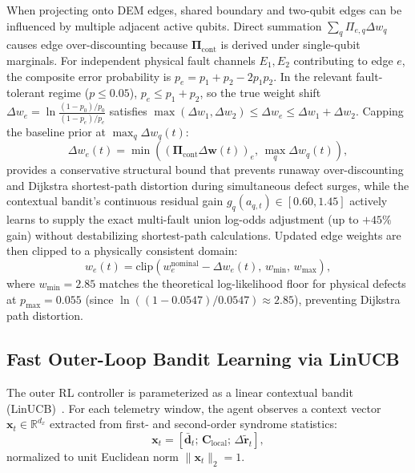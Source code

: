 \documentclass[aps,prxquantum,reprint,superscriptaddress,floatfix,nofootinbib]{revtex4-2}
\begin{document}
When projecting onto DEM edges, shared boundary and two-qubit edges can be influenced by multiple adjacent active qubits. Direct summation $\sum_q \Pi_{e, q} \Delta w_q$ causes edge over-discounting because $\mathbf{\Pi}_{\text{cont}}$ is derived under single-qubit marginals. For independent physical fault channels $E_1, E_2$ contributing to edge $e$, the composite error probability is $p_e = p_1 + p_2 - 2p_1 p_2$. In the relevant fault-tolerant regime ($p \le 0.05$), $p_e \le p_1 + p_2$, so the true weight shift $\Delta w_e = \ln \frac{(1-p_0)/p_0}{(1-p_e)/p_e}$ satisfies $\max(\Delta w_1, \Delta w_2) \le \Delta w_e \le \Delta w_1 + \Delta w_2$. Capping the baseline prior at $\max_q \Delta w_q(t)$:
\begin{equation}
    \Delta w_e(t) = \min\left( (\mathbf{\Pi}_{\text{cont}} \Delta \mathbf{w}(t))_e, \, \max_q \Delta w_q(t) \right),
    \label{eq:edge_shift_proj}
\end{equation}
provides a conservative structural bound that prevents runaway over-discounting and Dijkstra shortest-path distortion during simultaneous defect surges, while the contextual bandit's continuous residual gain $g_q(a_{q, t}) \in [0.60, 1.45]$ actively learns to supply the exact multi-fault union log-odds adjustment (up to $+45\%$ gain) without destabilizing shortest-path calculations. Updated edge weights are then clipped to a physically consistent domain:
\begin{equation}
    w_e(t) = \text{clip}\left( w_e^{\text{nominal}} - \Delta w_e(t), \, w_{\min}, \, w_{\max} \right),
    \label{eq:w_clip}
\end{equation}
where $w_{\min} = 2.85$ matches the theoretical log-likelihood floor for physical defects at $p_{\max} = 0.055$ (since $\ln((1 - 0.0547)/0.0547) \approx 2.85$), preventing Dijkstra path distortion.

\subsection{Fast Outer-Loop Bandit Learning via LinUCB}
\label{subsec:linucb}
The outer RL controller is parameterized as a linear contextual bandit (LinUCB)~\cite{li2010contextual}. For each telemetry window, the agent observes a context vector $\mathbf{x}_t \in \mathbb{R}^{d_x}$ extracted from first- and second-order syndrome statistics:
\begin{equation}
    \mathbf{x}_t = \left[ \bar{\mathbf{d}}_t; \, \mathbf{C}_{\text{local}}; \, \Delta \tilde{\mathbf{r}}_t \right],
\end{equation}
normalized to unit Euclidean norm $\|\mathbf{x}_t\|_2 = 1$.
\end{document}
